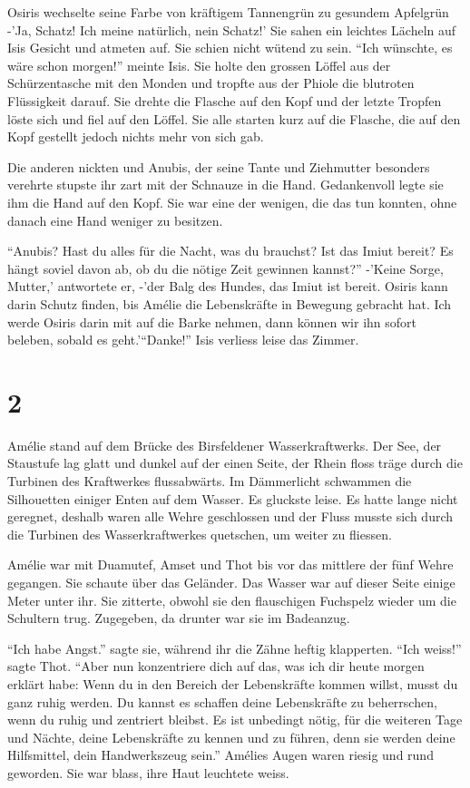 \documentclass[11pt,titlepage,a5paper]{book}
\begin{document}
Osiris wechselte seine Farbe von kräftigem Tannengrün zu gesundem Apfelgrün -'Ja, Schatz! Ich meine natürlich, nein Schatz!' Sie sahen ein leichtes Lächeln auf Isis Gesicht und atmeten auf. Sie schien nicht wütend zu sein. "`Ich wünschte, es wäre schon morgen!"' meinte Isis. Sie holte den grossen Löffel aus der Schürzentasche mit den Monden und tropfte aus der Phiole die blutroten Flüssigkeit darauf. Sie drehte die Flasche auf den Kopf und der letzte Tropfen löste sich und fiel auf den Löffel. Sie alle starten kurz auf die Flasche, die auf den Kopf gestellt jedoch nichts mehr von sich gab.

Die anderen nickten und Anubis, der seine Tante und Ziehmutter besonders verehrte stupste ihr zart mit der Schnauze in die Hand. Gedankenvoll legte sie ihm die Hand auf den Kopf. Sie war eine der wenigen, die das tun konnten, ohne danach eine Hand weniger zu besitzen.

"`Anubis? Hast du alles für die Nacht, was du brauchst? Ist das Imiut bereit? Es hängt soviel davon ab, ob du die nötige Zeit gewinnen kannst?"' -'Keine Sorge, Mutter,' antwortete er, -'der Balg des Hundes, das Imiut ist bereit. Osiris kann darin Schutz finden, bis Amélie die Lebenskräfte in Bewegung gebracht hat. Ich werde Osiris darin mit auf die Barke nehmen, dann können wir ihn sofort beleben, sobald es geht.'"`Danke!"' Isis verliess leise das Zimmer.

\section*{2}

Amélie stand auf dem Brücke des Birsfeldener Wasserkraftwerks. Der See, der Staustufe lag glatt und dunkel auf der einen Seite, der Rhein floss träge durch die Turbinen des Kraftwerkes flussabwärts. Im Dämmerlicht schwammen die Silhouetten einiger Enten auf dem Wasser. Es gluckste leise. Es hatte lange nicht geregnet, deshalb waren alle Wehre geschlossen und der Fluss musste sich durch die Turbinen des Wasserkraftwerkes quetschen, um weiter zu fliessen.

Amélie war mit Duamutef, Amset und Thot bis vor das mittlere der fünf Wehre gegangen. Sie schaute über das Geländer. Das Wasser war auf dieser Seite einige Meter unter ihr. Sie zitterte, obwohl sie den flauschigen Fuchspelz wieder um die Schultern trug. Zugegeben, da drunter war sie im Badeanzug.

"`Ich habe Angst."' sagte sie, während ihr die Zähne heftig klapperten. "`Ich weiss!"' sagte Thot. "`Aber nun konzentriere dich auf das, was ich dir heute morgen erklärt habe: Wenn du in den Bereich der Lebenskräfte kommen willst, musst du ganz ruhig werden. Du kannst es schaffen deine Lebenskräfte zu beherrschen, wenn du ruhig und zentriert bleibst. Es ist unbedingt nötig, für die weiteren Tage und Nächte, deine Lebenskräfte zu kennen und zu führen, denn sie werden deine Hilfsmittel, dein Handwerkszeug sein."' Amélies Augen waren riesig und rund geworden. Sie war blass, ihre Haut leuchtete weiss. 
\end{document}
